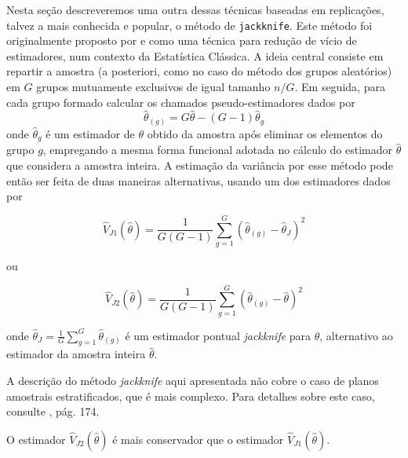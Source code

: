 \documentclass[]{book}
\theoremstyle{definition}
\theoremstyle{definition}
\theoremstyle{definition}
\theoremstyle{remark}
\let\BeginKnitrBlock\begin \let\EndKnitrBlock\end
\begin{document}
Nesta seção descreveremos uma outra dessas técnicas baseadas em
replicações, talvez a mais conhecida e popular, o método de
\texttt{jackknife}. Este método foi originalmente proposto por
\citep{Queno49} e \citep{Queno56} como uma técnica para redução de vício
de estimadores, num contexto da Estatística Clássica. A ideia central
consiste em repartir a amostra (a posteriori, como no caso do método dos
grupos aleatórios) em \(G\) grupos mutuamente exclusivos de igual
tamanho \(n/G\). Em seguida, para cada grupo formado calcular os
chamados pseudo-estimadores dados por \[
\widehat{\theta }_{\left( g\right) }=G\widehat{\theta }-\left( G-1\right) 
\widehat{\theta }_{g} 
\] onde \(\widehat{\theta }_{g}\) é um estimador de \(\theta\) obtido da
amostra após eliminar os elementos do grupo \(g\), empregando a mesma
forma funcional adotada no cálculo do estimador \(\widehat{\theta}\) que
considera a amostra inteira. A estimação da variância por esse método
pode então ser feita de duas maneiras alternativas, usando um dos
estimadores dados por

\begin{equation}
\widehat{V}_{J1}\left( \widehat{\theta }\right) =\frac{1}{G\left( G-1\right) 
}\sum_{g=1}^{G}\left( \widehat{\theta }_{\left( g\right) }-\widehat{\theta }
_{J}\right) ^{2}  \label{eq:estpa26}
\end{equation}

ou

\begin{equation}
\widehat{V}_{J2}\left( \widehat{\theta }\right) =\frac{1}{G\left( G-1\right) 
}\sum_{g=1}^{G}\left( \widehat{\theta }_{\left( g\right) }-\widehat{\theta }
\right) ^{2}  \label{eq:estpa27}
\end{equation}

onde
\(\widehat{\theta }_{J}=\frac{1}{G}\sum_{g=1}^{G}\widehat{\theta }_{\left( g\right)}\)
é um estimador pontual \emph{jackknife} para \(\theta\), alternativo ao
estimador da amostra inteira \(\hat{\theta}\).

\BeginKnitrBlock{remark}
{}A descrição do método \emph{jackknife}
aqui apresentada não cobre o caso de planos amostrais estratificados,
que é mais complexo. Para detalhes sobre este caso, consulte
\citep{W85}, pág. 174.
\EndKnitrBlock{remark}

\BeginKnitrBlock{remark}
{}O estimador
\(\widehat{V}_{J2}\left( \widehat{\theta }\right)\) é mais conservador
que o estimador \(\widehat{V}_{J1}\left( \widehat{\theta }\right)\).
\EndKnitrBlock{remark}
\end{document}
